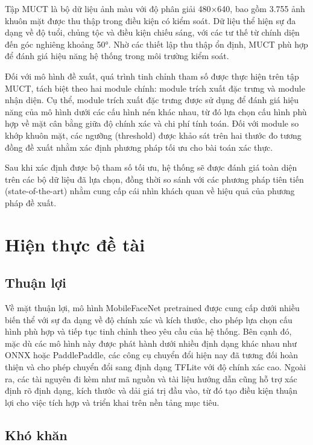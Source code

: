 Tập MUCT\cite{Milborrow2010TheML} là bộ dữ liệu ảnh màu với độ phân giải 480×640, bao gồm 3.755 ảnh khuôn mặt được thu thập trong điều kiện có kiểm soát. Dữ liệu thể hiện sự đa dạng về độ tuổi, chủng tộc và điều kiện chiếu sáng, với các tư thế từ chính diện đến góc nghiêng khoảng 50°. Nhờ các thiết lập thu thập ổn định, MUCT phù hợp để đánh giá hiệu năng hệ thống trong môi trường kiểm soát.

Đối với mô hình đề xuất, quá trình tinh chỉnh tham số được thực hiện trên tập MUCT, tách biệt theo hai module chính: module trích xuất đặc trưng và module nhận diện. Cụ thể, module trích xuất đặc trưng được sử dụng để đánh giá hiệu năng của mô hình dưới các cấu hình nén khác nhau, từ đó lựa chọn cấu hình phù hợp về mặt cân bằng giữa độ chính xác và chi phí tính toán. Đối với module so khớp khuôn mặt, các ngưỡng (threshold) được khảo sát trên hai thước đo tương đồng đề xuất nhằm xác định phương pháp tối ưu cho bài toán xác thực.

Sau khi xác định được bộ tham số tối ưu, hệ thống sẽ được đánh giá toàn diện trên các bộ dữ liệu đã lựa chọn, đồng thời so sánh với các phương pháp tiên tiến (state-of-the-art) nhằm cung cấp cái nhìn khách quan về hiệu quả của phương pháp đề xuất.

\section{Hiện thực đề tài}
\subsection{Thuận lợi}
Về mặt thuận lợi, mô hình MobileFaceNet pretrained được cung cấp dưới nhiều biến thể với sự đa dạng về độ chính xác và kích thước, cho phép lựa chọn cấu hình phù hợp và tiếp tục tinh chỉnh theo yêu cầu của hệ thống. Bên cạnh đó, mặc dù các mô hình này được phát hành dưới nhiều định dạng khác nhau như ONNX hoặc PaddlePaddle, các công cụ chuyển đổi hiện nay đã tương đối hoàn thiện và cho phép chuyển đổi sang định dạng TFLite với độ chính xác cao. Ngoài ra, các tài nguyên đi kèm như mã nguồn và tài liệu hướng dẫn cũng hỗ trợ xác định rõ định dạng, kích thước và dải giá trị đầu vào, từ đó tạo điều kiện thuận lợi cho việc tích hợp và triển khai trên nền tảng mục tiêu.
\subsection{Khó khăn}
